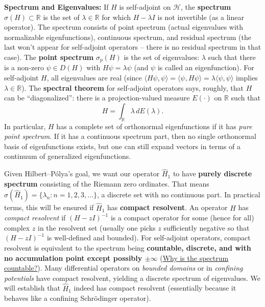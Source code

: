 \documentclass[12pt]{article}
\theoremstyle{plain}
\theoremstyle{definition}
\begin{document}
\textbf{Spectrum and Eigenvalues:} If \(H\) is self-adjoint on \(\mathcal{H}\), the \textbf{spectrum} \(\sigma(H)\subset \mathbb{R}\) is the set of \(\lambda\in \mathbb{R}\) for which \(H-\lambda I\) is not invertible (as a linear operator). The spectrum consists of point spectrum (actual eigenvalues with normalizable eigenfunctions), continuous spectrum, and residual spectrum (the last won’t appear for self-adjoint operators -- there is no residual spectrum in that case). The \textbf{point spectrum} \(\sigma_p(H)\) is the set of eigenvalues: \(\lambda\) such that there is a non-zero \(\psi\in D(H)\) with \(H\psi = \lambda \psi\) (and \(\psi\) is called an eigenfunction). For self-adjoint \(H\), all eigenvalues are real (since \(\langle H\psi,\psi\rangle = \langle \psi, H\psi\rangle = \lambda \langle \psi,\psi\rangle\) implies \(\lambda\in\mathbb{R}\)). The \textbf{spectral theorem} for self-adjoint operators says, roughly, that \(H\) can be ``diagonalized'': there is a projection-valued measure \(E(\cdot)\) on \(\mathbb{R}\) such that
\[
H = \int_{\mathbb{R}} \lambda\,dE(\lambda).
\]
In particular, \(H\) has a complete set of orthonormal eigenfunctions if it has \emph{pure point spectrum}. If it has a continuous spectrum part, then no single orthonormal basis of eigenfunctions exists, but one can still expand vectors in terms of a continuum of generalized eigenfunctions.

Given Hilbert--P\'olya's goal, we want our operator \(\hat{H}_1\) to have \textbf{purely discrete spectrum} consisting of the Riemann zero ordinates. That means \(\sigma(\hat{H}_1) = \{\lambda_n: n=1,2,3,\dots\}\), a discrete set with no continuous part. In practical terms, this will be ensured if \(\hat{H}_1\) has \textbf{compact resolvent}. An operator \(H\) has \emph{compact resolvent} if \((H - zI)^{-1}\) is a compact operator for some (hence for all) complex \(z\) in the resolvent set (usually one picks \(z\) sufficiently negative so that \((H-zI)^{-1}\) is well-defined and bounded). For self-adjoint operators, compact resolvent is equivalent to the spectrum being \textbf{countable, discrete, and with no accumulation point except possibly \(\pm\infty\)} (\href{https://math.stackexchange.com/questions/2007099/why-is-the-spectrum-of-an-operator-with-compact-resolvent-countable-and-consists}{Why is the spectrum countable?}). Many differential operators on \emph{bounded domains} or in \emph{confining potentials} have compact resolvent, yielding a discrete spectrum of eigenvalues. We will establish that \(\hat{H}_1\) indeed has compact resolvent (essentially because it behaves like a confining Schr\"odinger operator).
\end{document}
